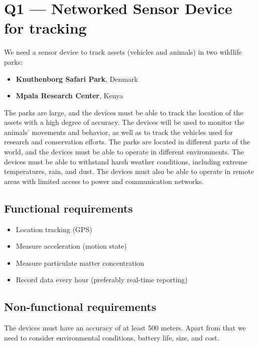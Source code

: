 \section{Q1 --- Networked Sensor Device for tracking}

We need a sensor device to track assets (vehicles and animals) in two wildlife parks:

\begin{itemize}
  \item \textbf{Knuthenborg Safari Park}, Denmark
  \item \textbf{Mpala Research Center}, Kenya
\end{itemize}

The parks are large, and the devices must be able to track the location of the assets with a high degree of accuracy. The devices will be used to monitor the animals' movements and behavior, as well as to track the vehicles used for research and conservation efforts.
The parks are located in different parts of the world, and the devices must be able to operate in different environments. The devices must be able to withstand harsh weather conditions, including extreme temperatures, rain, and dust. The devices must also be able to operate in remote areas with limited access to power and communication networks.

\subsection{Functional requirements}

\begin{itemize}
  \item Location tracking (GPS)
  \item Measure acceleration (motion state)
  \item Measure particulate matter concentration
  \item Record data every hour (preferably real-time reporting)
\end{itemize}

\subsection{Non-functional requirements}
The devices must have an accuracy of at least 500 meters. Apart from that we need to consider environmental conditions, battery life, size, and cost.

